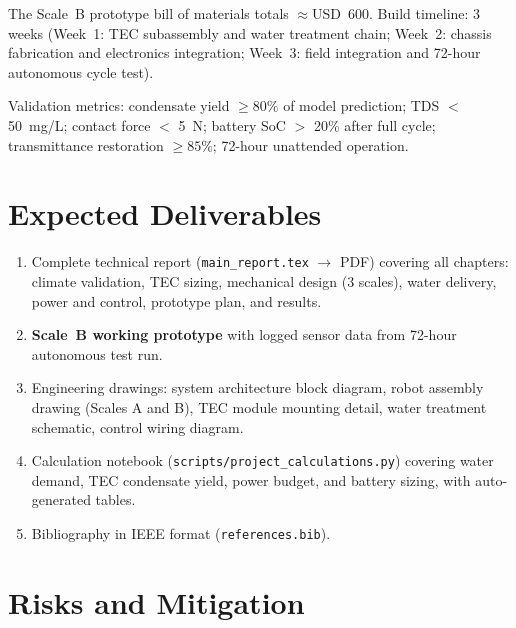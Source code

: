 \documentclass[11pt,a4paper]{article}
\begin{document}
The Scale~B prototype bill of materials totals $\approx$USD~600. Build timeline: 3 weeks
(Week~1: TEC subassembly and water treatment chain; Week~2: chassis fabrication and electronics
integration; Week~3: field integration and 72-hour autonomous cycle test).

Validation metrics: condensate yield $\geq 80\%$ of model prediction; TDS $<$ 50~mg/L;
contact force $<$ 5~N; battery SoC $>$ 20\% after full cycle; transmittance restoration
$\geq 85\%$; 72-hour unattended operation.

\section{Expected Deliverables}

\begin{enumerate}[leftmargin=*,noitemsep]
  \item Complete technical report (\texttt{main\_report.tex} $\rightarrow$ PDF) covering all
  chapters: climate validation, TEC sizing, mechanical design (3 scales), water delivery,
  power and control, prototype plan, and results.
  \item \textbf{Scale~B working prototype} with logged sensor data from 72-hour autonomous
  test run.
  \item Engineering drawings: system architecture block diagram, robot assembly drawing (Scales
  A and B), TEC module mounting detail, water treatment schematic, control wiring diagram.
  \item Calculation notebook (\texttt{scripts/project\_calculations.py}) covering water demand,
  TEC condensate yield, power budget, and battery sizing, with auto-generated tables.
  \item Bibliography in IEEE format (\texttt{references.bib}).
\end{enumerate}

\section{Risks and Mitigation}
\end{document}
